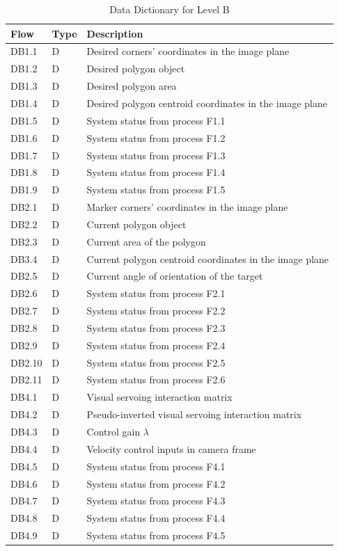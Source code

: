 \begin{table}[!htb]
	\caption{Data Dictionary for Level B}
	\label{tab:DD-LB-a}
	\centering
	\begin{tabular}{lll}
		\toprule
		Flow & Type & Description \\
		\midrule
		DB1.1 & D & Desired corners' coordinates in the image plane\\
		DB1.2 & D & Desired polygon object \\
		DB1.3 & D & Desired polygon area \\
		DB1.4 & D & Desired polygon centroid coordinates in the image plane \\
		DB1.5 & D & System status from process F1.1 \\
		DB1.6 & D & System status from process F1.2 \\
		DB1.7 & D & System status from process F1.3 \\
		DB1.8 & D & System status from process F1.4 \\
		DB1.9 & D & System status from process F1.5 \\
		\midrule
		DB2.1 & D & Marker corners' coordinates in the image plane \\
		DB2.2 & D & Current polygon object \\
		DB2.3 & D & Current area of the polygon \\
		DB3.4 & D & Current polygon centroid coordinates in the image plane \\
		DB2.5 & D & Current angle of orientation of the target \\
		DB2.6 & D & System status from process F2.1 \\
		DB2.7 & D & System status from process F2.2 \\
		DB2.8 & D & System status from process F2.3 \\
		DB2.9 & D & System status from process F2.4 \\
		DB2.10 & D & System status from process F2.5 \\
		DB2.11 & D & System status from process F2.6 \\
		\midrule
		DB4.1 & D & Visual servoing interaction matrix \\
		DB4.2 & D & Pseudo-inverted visual servoing interaction matrix \\
		DB4.3 & D & Control gain $\lambda$ \\
		DB4.4 & D & Velocity control inputs in camera frame \\
		DB4.5 & D & System status from process F4.1 \\
		DB4.6 & D & System status from process F4.2 \\
		DB4.7 & D & System status from process F4.3 \\
		DB4.8 & D & System status from process F4.4 \\
		DB4.9 & D & System status from process F4.5 \\
		\bottomrule
	\end{tabular}
\end{table}

